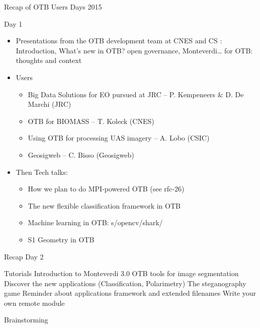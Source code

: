\documentclass[smaller]{beamer}
\begin{document}
\begin{frame}[label={sec:orgheadline2}]{Recap of OTB Users Days 2015}
\begin{block}{Day 1}
\begin{itemize}
\item Presentations from the OTB development team at CNES and CS :
Introduction, What’s new in OTB? open governance, Monteverdi\ldots{} for OTB: thoughts and context

\item Users

\begin{itemize}
\item Big Data Solutions for EO pursued at JRC – P. Kempeneers \& D. De Marchi (JRC)

\item OTB for BIOMASS – T. Koleck (CNES)

\item Using OTB for processing UAS imagery – A. Lobo (CSIC)

\item Geosigweb – C. Bisso (Geosigweb)
\end{itemize}

\item Then Tech talks:

\begin{itemize}
\item How we plan to do MPI-powered OTB (see rfc-26)

\item The new flexible classification framework in OTB

\item Machine learning in OTB: s/opencv/shark/

\item S1 Geometry in OTB
\end{itemize}
\end{itemize}
\end{block}
\end{frame}

\begin{frame}[label={sec:orgheadline3}]{Recap  Day 2}
\begin{block}{Tutorials}
Introduction to Monteverdi 3.0
OTB tools for image segmentation
Discover the new applications (Classification, Polarimetry)
The steganography game
Reminder about applications framework and extended filenames
Write your own remote module
\end{block}
\begin{block}{Brainstorming}
\end{block}
\end{frame}
\end{document}
